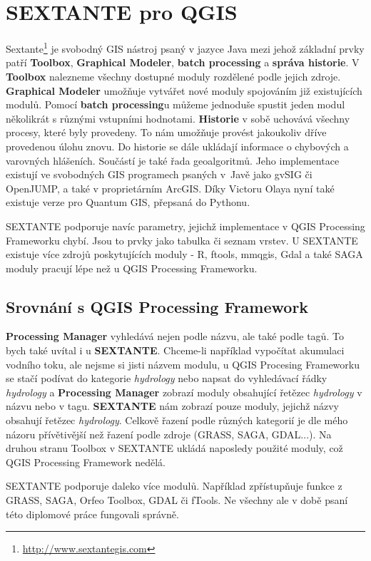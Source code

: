 \newpage
\chapter{SEXTANTE pro QGIS}
Sextante\footnote{\url{http://www.sextantegis.com}} je svobodný GIS nástroj
psaný v jazyce Java mezi jehož základní prvky
patří \textbf{Toolbox}, \textbf{Graphical Modeler}, \textbf{batch
processing} a \textbf{správa historie}. V \textbf{Toolbox} nalezneme
všechny dostupné moduly rozdělené podle jejich
zdroje. \textbf{Graphical Modeler} umožňuje vytvářet nové moduly
spojováním již existujících modulů. Pomocí \textbf{batch processing}u
můžeme jednoduše spustit jeden modul několikrát s různými vstupními
hodnotami. \textbf{Historie} v sobě uchovává všechny procesy, které
byly provedeny. To nám umožňuje provést jakoukoliv dříve provedenou
úlohu znovu. Do historie se dále ukládají informace o chybových a
varovných hlášeních. Součástí je také řada geoalgoritmů. Jeho
implementace existují ve svobodných GIS programech psaných v~Javě jako
gvSIG či OpenJUMP, a také v proprietárním ArcGIS. Díky Victoru Olaya
nyní také existuje verze pro Quantum GIS, přepsaná do Pythonu.

SEXTANTE podporuje navíc parametry, jejichž implementace v QGIS
Processing Frameworku chybí. Jsou to prvky jako tabulka či seznam
vrstev. U SEXTANTE existuje více zdrojů poskytujících moduly - R,
ftools, mmqgis, Gdal a také SAGA moduly pracují lépe než u QGIS
Processing Frameworku.

\section{Srovnání s QGIS Processing Framework}

\textbf{Processing Manager} vyhledává nejen podle názvu, ale také podle tagů. To bych také uvítal i u \textbf{SEXTANTE}. Chceme-li například vypočítat akumulaci vodního toku, ale nejsme si jisti názvem modulu, u QGIS Procesing Frameworku se stačí podívat do kategorie \textit{hydrology} nebo napsat do vyhledávací řádky \textit{hydrology} a \textbf{Processing Manager} zobrazí moduly obsahující řetězec \textit{hydrology} v názvu nebo v tagu. \textbf{SEXTANTE} nám zobrazí pouze moduly, jejichž názvy obsahují řetězec \textit{hydrology}. Celkově řazení podle různých kategorií je dle mého názoru přívětivější než řazení podle zdroje (GRASS, SAGA, GDAL...). Na druhou stranu Toolbox v SEXTANTE ukládá naposledy použité moduly, což QGIS Processing Framework nedělá.

SEXTANTE podporuje daleko více modulů. Například zpřístupňuje funkce z
GRASS, SAGA, Orfeo Toolbox, GDAL či fTools. Ne všechny ale v době
psaní této diplomové práce fungovali správně.

